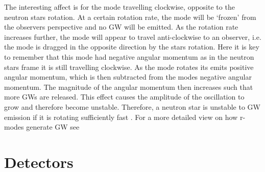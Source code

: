 The interesting affect is for the mode travelling clockwise, opposite to the neutron stars rotation. 
At a certain rotation rate, the mode will be `frozen' from the observers perspective and no \gls{GW} will be emitted.
As the rotation rate increases further, the mode will appear to travel anti-clockwise to an observer, i.e. the mode is dragged in the opposite direction by the stars rotation. 
Here it is key to remember that this mode had negative angular momentum as in the neutron stars frame it is still travelling clockwise.
As the mode rotates its emits positive angular momentum, which is then subtracted from the modes negative angular momentum.
The magnitude of the angular momentum then increases such that more \glspl{GW} are released.
This effect causes the amplitude of the oscillation to grow and therefore become unstable.
Therefore, a neutron star is unstable to \gls{GW} emission if it is rotating sufficiently fast \citep{lasky2015GravitationalWaves}.
For a more detailed view on how r-modes generate \gls{GW} see \citep{owen1998GravitationalWaves,jonesCFSInstability}
\fi


\section{\label{intro:detector}Detectors}

